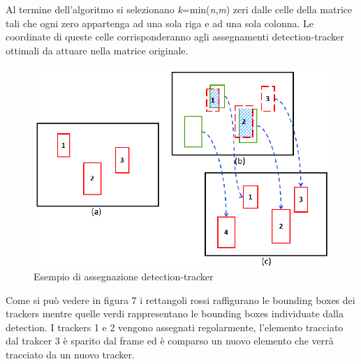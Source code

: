 Al termine dell'algoritmo si selezionano \textit{k}=min(\textit{n},\textit{m}) zeri dalle celle della matrice tali che ogni zero appartenga ad una sola riga e ad una sola colonna. Le coordinate di queste celle corrisponderanno agli assegnamenti detection-tracker ottimali da attuare nella matrice originale.
\begin{figure}[H]
	\centering
	\includegraphics[width=0.7\linewidth]{images/detection-tracker-assignment.png}
	\caption{Esempio di assegnazione detection-tracker}
	\label{Esempio di assegnazione detection-tracker}
\end{figure}
Come si può vedere in figura 7 i rettangoli rossi raffigurano le bounding boxes dei trackers mentre quelle verdi rappresentano le bounding boxes individuate dalla detection. I trackers 1 e 2 vengono assegnati regolarmente, l'elemento tracciato dal trakcer 3 è sparito dal frame ed è comparso un nuovo elemento che verrà tracciato da un nuovo tracker.
